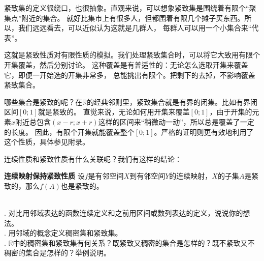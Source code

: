 \documentclass[12pt,UTF8,fontset=none]{ctexbook}
\begin{document}
紧致集的定义很绕口，也很抽象。直观来说，可以想象紧致集是围绕着有限个“聚集点”附近的集合。
就好比集市上有很多人，但都围着有限几个摊子买东西。所以，我们远远看去，可以近似认为这就是几群人，
每群人可以用一个小集合来“代表”。

这就是紧致性质对有限性质的模拟。我们处理紧致集合时，可以将它大致用有限个开集覆盖，然后分别讨论。
这种覆盖是有普适性的：无论怎么选取开集来覆盖它，即便一开始选的开集非常多，
总能挑出有限个。把剩下的去掉，不影响覆盖紧致集合。

哪些集合是紧致的呢？在$\mathbb{R}$的经典邻则里，紧致集合就是有界的闭集。比如有界闭区间$[0;1]$就是紧致的。
直觉来说，无论如何用开集来覆盖$[0;1]$，由于开集的元素$x$附近总包含$(x-r;x+r)$这样的区间来“稍微动一动”，所以总是覆盖了一定的长度。
因此，有限个开集就能覆盖整个$[0;1]$。严格的证明则更有效地利用了这个性质，具体参见附录。

连续性质和紧致性质有什么关联呢？我们有这样的结论：
\begin{tm}{\textbf{连续映射保持紧致性质}}
    设$f$是有邻空间$X$到有邻空间$Y$的连续映射，$X$的子集$A$是紧致的，那么$f(A)$也是紧致的。
\end{tm}

\begin{sk}
    \mbox{} \\
    . 对比用邻域表达的函数连续定义和之前用区间或数列表达的定义，说说你的想法。\\
    . 用邻域的概念定义稠密集和紧致集。\\
    . $\mathbb{R}$中的稠密集和紧致集有何关系？既紧致又稠密的集合是怎样的？既不紧致又不稠密的集合是怎样的？举例说明。
\end{sk}
\end{document}

